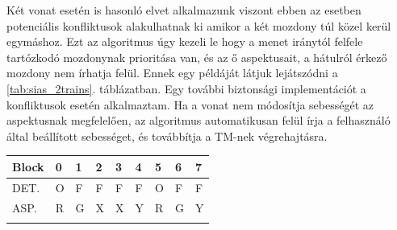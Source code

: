 \documentclass[a4paper,12pt]{article}
\begin{document}
Két vonat esetén is hasonló elvet alkalmazunk viszont ebben az esetben potenciális konfliktusok alakulhatnak ki amikor a két mozdony túl közel kerül egymáshoz.
Ezt az algoritmus úgy kezeli le hogy a menet iránytól felfele tartózkodó mozdonynak prioritása van, és az ő aspektusait, a hátulról érkező mozdony nem írhatja felül.
Ennek egy példáját látjuk lejátszódni a \ref{tab:sias_2trains}. táblázatban. 
Egy további biztonsági implementációt a konfliktusok esetén alkalmaztam.
Ha a vonat nem módosítja sebességét az aspektusnak megfelelően, az algoritmus automatikusan felül írja a felhasználó által beállított sebességet, és továbbítja a TM-nek végrehajtásra.

\begin{table}[htp]
\centering
\begin{tabular}{lllllllll}
\hline
\multicolumn{1}{|l|}{Block} & \multicolumn{1}{l|}{0}                         & \multicolumn{1}{l|}{1}                         & \multicolumn{1}{l|}{2}                                                & \multicolumn{1}{l|}{3}                                                & \multicolumn{1}{l|}{4}                         & \multicolumn{1}{l|}{5}                         & \multicolumn{1}{l|}{6}                                                & \multicolumn{1}{l|}{7}                                                \\ \hline
\multicolumn{1}{|l|}{DET.}  & \multicolumn{1}{l|}{\cellcolor[HTML]{FD6864}O} & \multicolumn{1}{l|}{\cellcolor[HTML]{32CB00}F} & \multicolumn{1}{l|}{\cellcolor[HTML]{32CB00}F}                        & \multicolumn{1}{l|}{\cellcolor[HTML]{32CB00}F}                        & \multicolumn{1}{l|}{\cellcolor[HTML]{32CB00}F} & \multicolumn{1}{l|}{\cellcolor[HTML]{FD6864}O} & \multicolumn{1}{l|}{\cellcolor[HTML]{32CB00}F}                        & \multicolumn{1}{l|}{\cellcolor[HTML]{32CB00}F}                        \\ \hline
\multicolumn{1}{|l|}{ASP.}  & \multicolumn{1}{l|}{\cellcolor[HTML]{FE0000}R} & \multicolumn{1}{l|}{\cellcolor[HTML]{009901}G} & \multicolumn{1}{l|}{X}                                                & \multicolumn{1}{l|}{X}                                                & \multicolumn{1}{l|}{\cellcolor[HTML]{F8FF00}Y} & \multicolumn{1}{l|}{\cellcolor[HTML]{FE0000}R} & \multicolumn{1}{l|}{\cellcolor[HTML]{009901}G}                        & \multicolumn{1}{l|}{\cellcolor[HTML]{F8FF00}Y}                        \\ \hline
                            &                                                &                                                &                                                                       &                                                                       &                                                &                                                &                                                                       &                                                                       \\ \hline

\end{tabular}
\end{table}
\end{document}
